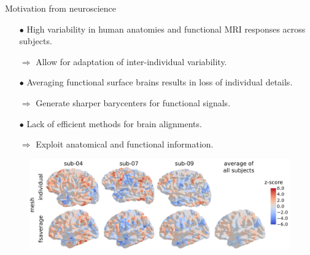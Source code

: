 \documentclass{beamer}
\begin{document}
\begin{frame}{Motivation from neuroscience}
\scriptsize
\begin{itemize}
  \setlength\itemsep{0.3cm}
  \item[$\bullet$] High variability in human anatomies and functional MRI responses across subjects.

  $\Rightarrow$ Allow for adaptation of inter-individual variability.

  \item[$\bullet$] Averaging functional surface brains results in loss of individual details.

  $\Rightarrow$ Generate sharper barycenters for functional signals.

  \item[$\bullet$] Lack of efficient methods for brain alignments.

  $\Rightarrow$ Exploit anatomical and functional information.
\end{itemize}
\begin{figure}
  \centering
  \includegraphics[width=1.\linewidth, keepaspectratio=true]{OT_new/intro_variation.pdf}
\end{figure}
\end{frame}
\end{document}
